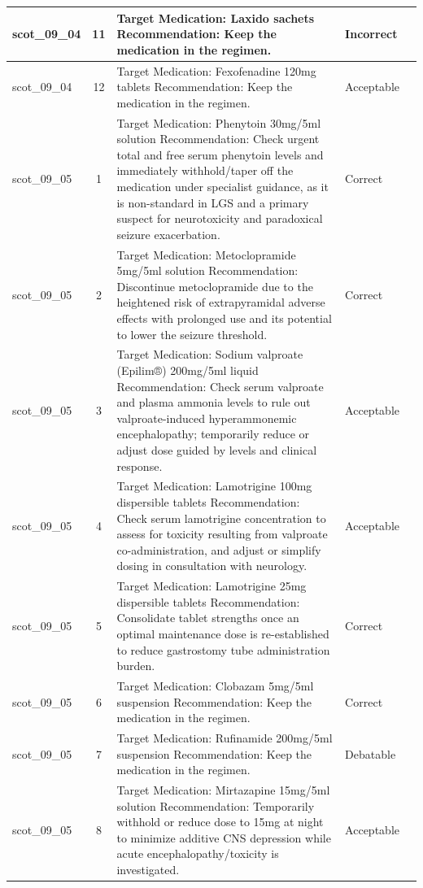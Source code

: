 \begin{longtable}{|p{1.45cm}|c|p{10.2cm}|p{1.55cm}|p{2.3cm}|}
\hline
scot\_09\_04 & 11 & Target Medication: Laxido sachets Recommendation: Keep the medication in the regimen. & Incorrect &  \\
\hline
scot\_09\_04 & 12 & Target Medication: Fexofenadine 120mg tablets Recommendation: Keep the medication in the regimen. & Acceptable &  \\
\hline
scot\_09\_05 & 1 & Target Medication: Phenytoin 30mg/5ml solution Recommendation: Check urgent total and free serum phenytoin levels and immediately withhold/taper off the medication under specialist guidance, as it is non-standard in LGS and a primary suspect for neurotoxicity and paradoxical seizure exacerbation. & Correct &  \\
\hline
scot\_09\_05 & 2 & Target Medication: Metoclopramide 5mg/5ml solution Recommendation: Discontinue metoclopramide due to the heightened risk of extrapyramidal adverse effects with prolonged use and its potential to lower the seizure threshold. & Correct &  \\
\hline
scot\_09\_05 & 3 & Target Medication: Sodium valproate (Epilim®) 200mg/5ml liquid Recommendation: Check serum valproate and plasma ammonia levels to rule out valproate-induced hyperammonemic encephalopathy; temporarily reduce or adjust dose guided by levels and clinical response. & Acceptable &  \\
\hline
scot\_09\_05 & 4 & Target Medication: Lamotrigine 100mg dispersible tablets Recommendation: Check serum lamotrigine concentration to assess for toxicity resulting from valproate co-administration, and adjust or simplify dosing in consultation with neurology. & Acceptable &  \\
\hline
scot\_09\_05 & 5 & Target Medication: Lamotrigine 25mg dispersible tablets Recommendation: Consolidate tablet strengths once an optimal maintenance dose is re-established to reduce gastrostomy tube administration burden. & Correct &  \\
\hline
scot\_09\_05 & 6 & Target Medication: Clobazam 5mg/5ml suspension Recommendation: Keep the medication in the regimen. & Correct &  \\
\hline
scot\_09\_05 & 7 & Target Medication: Rufinamide 200mg/5ml suspension Recommendation: Keep the medication in the regimen. & Debatable &  \\
\hline
scot\_09\_05 & 8 & Target Medication: Mirtazapine 15mg/5ml solution Recommendation: Temporarily withhold or reduce dose to 15mg at night to minimize additive CNS depression while acute encephalopathy/toxicity is investigated. & Acceptable &  \\

\end{longtable}
